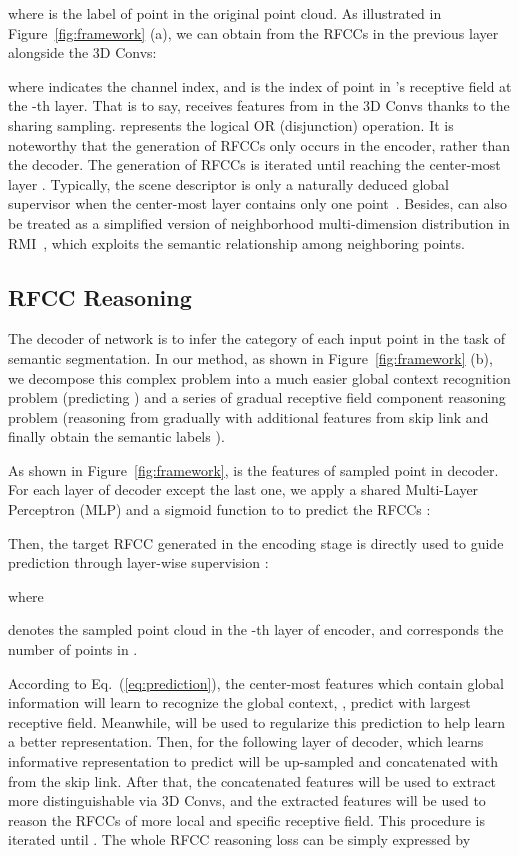 \documentclass[final]{cvpr}
\begin{document}
where  is the label of point  in the original point cloud.
As illustrated in Figure~\ref{fig:framework} (a), we can obtain  from the RFCCs in the previous layer  alongside the 3D Convs:

where  indicates the channel index, and  is the index of point in 's receptive field at the -th layer. That is to say,  receives features from  in the 3D Convs thanks to the sharing sampling.  represents the logical OR (disjunction) operation. It is noteworthy that the generation of RFCCs only occurs in the encoder, rather than the decoder. The generation of RFCCs is iterated until reaching the center-most layer .
Typically, the scene descriptor is only a naturally deduced global supervisor when the center-most layer contains only one point~\cite{xu2020sceneencoder}. Besides,  can also be treated as a simplified version of neighborhood multi-dimension distribution in RMI~\cite{zhao2019region}, which exploits the semantic relationship among neighboring points.

\subsection{RFCC Reasoning}
\label{subsec:reasoning}
The decoder of network is to infer the category of each input point in the task of semantic segmentation. In our method, as shown in Figure~\ref{fig:framework} (b), we decompose this complex problem into a much easier global context recognition problem (predicting ) and a series of gradual receptive field component reasoning problem (reasoning  from  gradually with additional features  from skip link and finally obtain the semantic labels ).



As shown in Figure~\ref{fig:framework},  is the features of sampled point  in decoder. For each layer of decoder except the last one, we apply a shared Multi-Layer Perceptron (MLP)  and a sigmoid function  to  to predict the RFCCs :

Then, the target RFCC  generated in the encoding stage is directly used to guide  prediction through layer-wise supervision :

where

 denotes the sampled point cloud in the -th layer of encoder, and  corresponds the number of points in .

According to Eq.~(\ref{eq:prediction}), the center-most features  which contain global information will learn to recognize the global context, \ie, predict  with largest receptive field. Meanwhile,  will be used to regularize this prediction to help  learn a better representation. Then, for the following layer of decoder,  which learns informative representation to predict  will be up-sampled and concatenated with  from the skip link. After that, the concatenated features will be used to extract more distinguishable  via 3D Convs, and the extracted features  will be used to reason the RFCCs  of more local and specific receptive field. This procedure is iterated until . The whole RFCC reasoning loss can be simply expressed by
\end{document}
